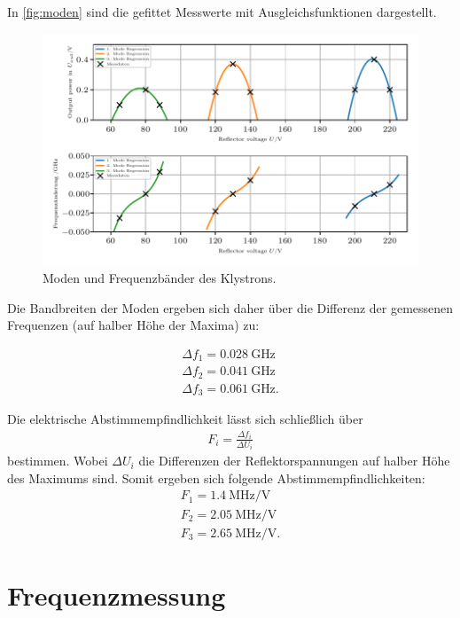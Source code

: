 In \autoref{fig:moden} sind die gefittet Messwerte mit Ausgleichsfunktionen dargestellt.
\begin{figure}
    \centering
    \includegraphics[scale=1]{content/V53_pictures/messung1.pdf}
    \caption{Moden und Frequenzbänder des Klystrons.}
    \label{fig:moden}
\end{figure}

Die Bandbreiten der Moden ergeben sich daher über die Differenz der gemessenen Frequenzen (auf halber Höhe der Maxima) zu:

\begin{align*}
    \Delta f_1 = \qty{0,028}{\giga\hertz} \\
    \Delta f_2 = \qty{0,041}{\giga\hertz} \\
    \Delta f_3 = \qty{0,061}{\giga\hertz}.
\end{align*}

Die elektrische Abstimmempfindlichkeit lässt sich schließlich über 
\begin{align*}
    F_i = \frac{\Delta f_i}{\Delta U_i}
\end{align*}
bestimmen. Wobei $\Delta U_i$ die Differenzen der Reflektorspannungen auf halber Höhe des Maximums sind. Somit ergeben sich folgende Abstimmempfindlichkeiten:\\
\begin{align*}
     F_1 = \qty{1,4}{\mega\hertz\per\volt}\\
     F_2 = \qty{2,05}{\mega\hertz\per\volt}\\
     F_3 = \qty{2,65}{\mega\hertz\per\volt}.
\end{align*}

\section{Frequenzmessung}


